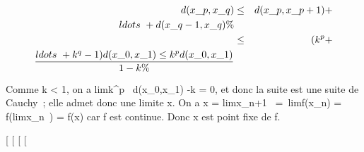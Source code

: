 \documentclass[]{article}
\begin{document}
\begin{align*} d(x\_p,x\_q)& \leq&
d(x\_p,x\_p+1) +
\\ldots~ +
d(x\_q-1,x\_q) \%& \\ &
\leq& (k^p +
\\ldots~ +
k^q-1)d(x\_ 0,x\_1) \leq k^p
d(x\_0,x\_1) \over 1 - k \%&
\\ \end{align*}

Comme k \textless{} 1, on a
limk^p~
d(x\_0,x\_1) -k = 0, et donc la
suite est une suite de Cauchy~; elle admet donc une limite x. On a x
= limx\_n+1~ =\
limf(x\_n) = f(limx\_n~) =
f(x) car f est continue. Donc x est point fixe de f.

{[}
{[}
{[}
{[}
\end{document}

